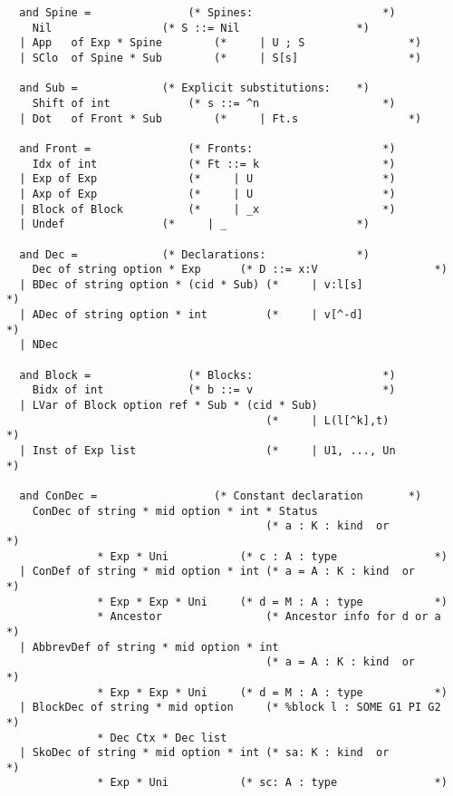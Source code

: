 \begin{verbatim}
  and Spine =				(* Spines:                    *)
    Nil					(* S ::= Nil                  *)
  | App   of Exp * Spine		(*     | U ; S                *)
  | SClo  of Spine * Sub		(*     | S[s]                 *)

  and Sub =				(* Explicit substitutions:    *)
    Shift of int			(* s ::= ^n                   *)
  | Dot   of Front * Sub		(*     | Ft.s                 *)

  and Front =				(* Fronts:                    *)
    Idx of int				(* Ft ::= k                   *)
  | Exp of Exp				(*     | U                    *)
  | Axp of Exp				(*     | U                    *)
  | Block of Block			(*     | _x                   *)
  | Undef				(*     | _                    *)

  and Dec =				(* Declarations:              *)
    Dec of string option * Exp		(* D ::= x:V                  *)
  | BDec of string option * (cid * Sub)	(*     | v:l[s]               *)
  | ADec of string option * int	        (*     | v[^-d]               *)
  | NDec  

  and Block =				(* Blocks:                    *)
    Bidx of int				(* b ::= v                    *)
  | LVar of Block option ref * Sub * (cid * Sub)
                                        (*     | L(l[^k],t)           *)
  | Inst of Exp list                    (*     | U1, ..., Un          *)

  and ConDec =			        (* Constant declaration       *)
    ConDec of string * mid option * int * Status
                                        (* a : K : kind  or           *)
              * Exp * Uni	        (* c : A : type               *)
  | ConDef of string * mid option * int	(* a = A : K : kind  or       *)
              * Exp * Exp * Uni		(* d = M : A : type           *)
              * Ancestor                (* Ancestor info for d or a   *)
  | AbbrevDef of string * mid option * int
                                        (* a = A : K : kind  or       *)
              * Exp * Exp * Uni		(* d = M : A : type           *)
  | BlockDec of string * mid option     (* %block l : SOME G1 PI G2   *)
              * Dec Ctx * Dec list
  | SkoDec of string * mid option * int	(* sa: K : kind  or           *)
              * Exp * Uni	        (* sc: A : type               *)

\end{verbatim} 
